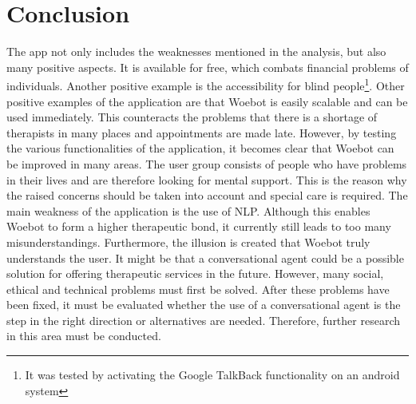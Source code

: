 \section{Conclusion}\label{sec:conclusion}
The app not only includes the weaknesses mentioned in the analysis, but also many positive aspects.
It is available for free, which combats financial problems of individuals.
Another positive example is the accessibility for blind people\footnote{It was tested by activating the Google TalkBack functionality on an android system}.
Other positive examples of the application are that Woebot is easily scalable and can be used immediately.
This counteracts the problems that there is a shortage of therapists in many places and appointments are made late.
However, by testing the various functionalities of the application, it becomes clear that Woebot can be improved in many areas.
The user group consists of people who have problems in their lives and are therefore looking for mental support.
This is the reason why the raised concerns should be taken into account and special care is required.
The main weakness of the application is the use of NLP.
Although this enables Woebot to form a higher therapeutic bond, it currently still leads to too many misunderstandings.
Furthermore, the illusion is created that Woebot truly understands the user.
It might be that a conversational agent could be a possible solution for offering therapeutic services in the future.
However, many social, ethical and technical problems must first be solved.
After these problems have been fixed, it must be evaluated whether the use of a conversational agent is the step in the right direction or alternatives are needed.
Therefore, further research in this area must be conducted.
